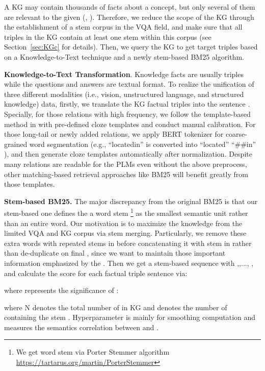 \documentclass[sigconf]{acmart}
\begin{document}
A KG may contain thousands of facts about a concept, but only several of them are relevant to the given (, ).
Therefore, we reduce the scope of the KG through the establishment of a stem corpus in the VQA field, and make sure that all triples in the KG contain at least one stem within this corpus (see Section~\ref{sec:KGc} for details).
Then, we query the KG to get target triples based on a Knowledge-to-Text technique and a newly stem-based BM25 \citep{DBLP:journals/ftir/RobertsonZ09} algorithm.

\noindent\textbf{Knowledge-to-Text Transformation}. Knowledge facts are usually triples while the questions and answers are textual format. To realize the unification of three different modalities (i.e., vision, unstructured language, and structured knowledge) data, firstly, we translate the KG factual triples  into  the sentence . 
Specially, for those relations with high frequency, we follow the template-based method in \citep{DBLP:conf/aaai/BianH0021,DBLP:conf/eacl/HeinzerlingI21} with pre-defined cloze templates and conduct manual calibration.
For those long-tail or newly added relations, 
we apply BERT \citep{DBLP:conf/naacl/DevlinCLT19} tokenizer for coarse-grained word segmentation (e.g., ``locatedin'' is converted into ``located'' ``\#\#in'' ), and then generate cloze templates automatically after normalization.
Despite many relations are readable for the PLMs even without the above preprocess, other matching-based retrieval approaches like BM25 will benefit greatly from those templates.

\noindent\textbf{Stem-based BM25.}
The major discrepancy from the original BM25 is that our stem-based one defines the a word stem \footnote{ We get word stem via Porter Stemmer algorithm \url{https://tartarus.org/martin/PorterStemmer}} 
as the smallest semantic unit rather than an entire word. 
Our motivation is to maximize the knowledge from the limited VQA and KG corpus via stem merging.
Particularly, we remove these extra words with repeated stems in  before concatenating it with stem in  rather than de-duplicate on final , since we want to maintain those important information emphasized by the . 
Then we get a stem-based sequence  with ,,..., , and calculate the score for each factual triple sentence  via: 

where  represents the significance of :

where N denotes the total number of  in KG and  denotes the number of  containing the stem . Hyperparameter  is mainly for smoothing computation and  measures the semantics correlation between  and  \citep{DBLP:journals/ftir/RobertsonZ09}.
\end{document}
